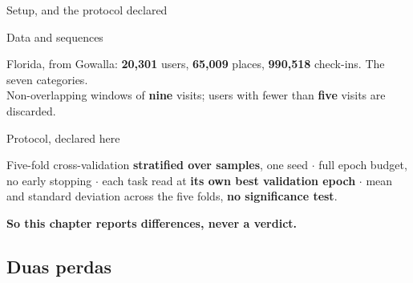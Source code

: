 \documentclass{beamer}
\begin{document}
\begin{frame}{Setup, and the protocol declared}

    \begin{block}{Data and sequences}
        {\small
        Florida, from Gowalla: \textbf{20,301} users, \textbf{65,009} places, \textbf{990,518} check-ins. The seven categories.\\
        Non-overlapping windows of \textbf{nine} visits; users with fewer than \textbf{five} visits are discarded.\par}
    \end{block}
    \begin{alertblock}{Protocol, declared here}
        {\small
        Five-fold cross-validation \textbf{stratified over samples}, one seed $\cdot$ full epoch budget, no early stopping $\cdot$ each task read at \textbf{its own best validation epoch} $\cdot$ mean and standard deviation across the five folds, \textbf{no significance test}.\par}
    \end{alertblock}

    \vfill
    {\centering\textbf{So this chapter reports differences, never a verdict.}\par}
\end{frame}

\subsection{Duas perdas}
\end{document}
